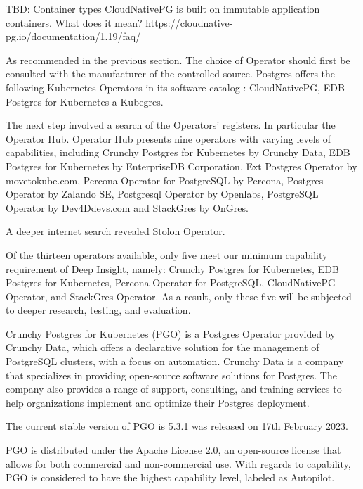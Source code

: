 TBD: Container types CloudNativePG is built on immutable application containers. What does it mean? https://cloudnative-pg.io/documentation/1.19/faq/

As recommended in the previous section. The choice of Operator should first be consulted with the manufacturer of the controlled source. Postgres offers the following Kubernetes Operators in its software catalog \cite{docuPgSwCatalogue}: CloudNativePG, EDB Postgres for Kubernetes a Kubegres.

The next step involved a search of the Operators' registers. In particular the Operator Hub. \cite{OperatorHubPGSearch} Operator Hub presents nine operators with varying levels of capabilities, including Crunchy Postgres for Kubernetes by Crunchy Data, EDB Postgres for Kubernetes by EnterpriseDB Corporation, Ext Postgres Operator by movetokube.com, Percona Operator for PostgreSQL by Percona, Postgres-Operator by Zalando SE, Postgresql Operator by Openlabs, PostgreSQL Operator by Dev4Ddevs.com and StackGres by OnGres.

A deeper internet search revealed Stolon Operator. \cite{PalarkComparingKubernetes}

Of the thirteen operators available, only five meet our minimum capability requirement of Deep Insight, namely: Crunchy Postgres for Kubernetes, EDB Postgres for Kubernetes, Percona Operator for PostgreSQL, CloudNativePG Operator, and StackGres Operator. As a result, only these five will be subjected to deeper research, testing, and evaluation.

\pagebreak
{}
Crunchy Postgres for Kubernetes (PGO) is a Postgres Operator provided by Crunchy Data, which offers a declarative solution for the management of PostgreSQL clusters, with a focus on automation.
Crunchy Data is a company that specializes in providing open-source software solutions for Postgres. The company also provides a range of support, consulting, and training services to help organizations implement and optimize their Postgres deployment. \cite{Crunchy}

The current stable version of PGO is 5.3.1 was released on 17th February 2023. \cite{CrunchyV531releaseNotes}

PGO is distributed under the Apache License 2.0, an open-source license that allows for both commercial and non-commercial use. With regards to capability, PGO is considered to have the highest capability level, labeled as Autopilot. \cite{OperatorHubCrunchy}

